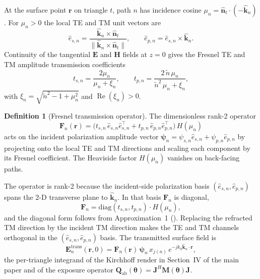 \documentclass[10pt,journal,twocolumn]{IEEEtran}
\newcommand{\rr}{\bm{r}}
\newcommand{\nhat}{\hat{\bm{n}}}
\newcommand{\khat}{\hat{\bm{k}}}
\newcommand{\Qabs}{\mathbf{Q}_{\mathrm{ab}}}
\newcommand{\Jmat}{\mathbf{J}}
\newcommand{\Fn}{\mathbf{F}_n}
\newcommand{\psin}{\bm{\psi}_n}
\newcommand{\thetab}{\bm{\theta}}
\newcommand{\ntilde}{\tilde{n}}
\DeclareMathOperator{\RE}{Re}
\theoremstyle{plain}
\theoremstyle{definition}
\newtheorem{definition}[proposition]{Definition}
\begin{document}
At the surface point $\rr$ on triangle $t$, path $n$ has incidence
cosine $\mu_n = \nhat_t \cdot (-\khat_n)$. For $\mu_n > 0$ the local
TE and TM unit vectors are
\begin{equation}\label{eq:S-TE-TM-basis}
  \hat{e}_{s,n} = \frac{\khat_n \times \nhat_t}
                       {\|\khat_n \times \nhat_t\|},
  \qquad
  \hat{e}_{p,n} = \hat{e}_{s,n} \times \khat_n.
\end{equation}
Continuity of the tangential $\bm{E}$ and $\bm{H}$ fields at $z=0$
gives the Fresnel TE and TM amplitude transmission coefficients
\begin{equation}\label{eq:S-fresnel-t}
  t_{s,n} = \frac{2 \mu_n}{\mu_n + \xi_n},
  \qquad
  t_{p,n} = \frac{2\,\ntilde\,\mu_n}{\ntilde^2\,\mu_n + \xi_n},
\end{equation}
with $\xi_n = \sqrt{\ntilde^2 - 1 + \mu_n^2}$ and $\RE(\xi_n) > 0$.

\begin{definition}[Fresnel transmission operator]\label{def:S-Fn}
The dimensionless rank-2 operator
\begin{equation}\label{eq:S-Fn-def}
  \Fn(\rr) =
  \bigl(t_{s,n}\,\hat{e}_{s,n}\hat{e}_{s,n}^{\!\top}
      + t_{p,n}\,\hat{e}_{p,n}\hat{e}_{p,n}^{\!\top}\bigr)\,H(\mu_n)
\end{equation}
acts on the incident polarization amplitude vector
$\psin = \psi_{s,n}\hat{e}_{s,n} + \psi_{p,n}\hat{e}_{p,n}$ by
projecting onto the local TE and TM directions and scaling each
component by its Fresnel coefficient. The Heaviside factor
$H(\mu_n)$ vanishes on back-facing paths.
\end{definition}

The operator is rank-2 because the incident-side polarization basis
$(\hat{e}_{s,n}, \hat{e}_{p,n})$ spans the 2-D transverse plane to
$\khat_n$. In that basis $\Fn$ is diagonal,
\begin{equation}\label{eq:S-Fn-diag}
  \Fn = \mathrm{diag}(t_{s,n}, t_{p,n}) \cdot H(\mu_n),
\end{equation}
and the diagonal form follows from Approximation~1
(). Replacing the refracted TM direction by the
incident TM direction makes the TE and TM channels orthogonal in the
$(\hat{e}_{s,n}, \hat{e}_{p,n})$ basis. The transmitted surface
field is
\begin{equation}\label{eq:S-Etrans}
  \bm{E}_n^{\mathrm{trans}}(\rr, 0)
    = \Fn(\rr)\,\psin\,x_{j(n)}\,e^{-jk_0\khat_n\cdot\rr},
\end{equation}
the per-triangle integrand of the Kirchhoff render in Section~IV of
the main paper and of the exposure operator
$\Qabs(\thetab) = \Jmat^{H}\mathbf{M}(\thetab)\Jmat$.
\end{document}
